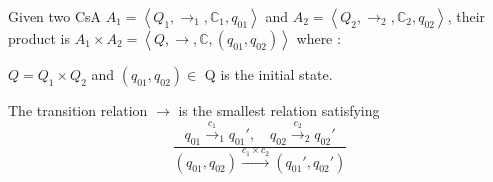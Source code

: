 \begin{definition}
	Given two CsA $A_1=\left\langle Q_1, \rightarrow_1, \mathbb{C}_1, q_{01} \right\rangle$ and $A_2=\left\langle Q_2, \rightarrow_2, \mathbb{C}_2, q_{02} \right\rangle$, their product is $ A_1 \times A_2 = \left \langle Q, \rightarrow, \mathbb{C}, (q_{01},q_{02}) \right \rangle$ where : 
	\begin{list}{-}{ }
		\item $Q= Q_1 \times Q_2 $ and $(q_{01},q_{02})\in$ Q is the initial state.
		\item The transition relation $\rightarrow$ is the smallest relation satisfying
		$$
		\frac{q_{01} \xrightarrow{c_1}_1 q_{01}' ,\quad q_{02} \xrightarrow{c_2}_2 q_{02}' }{(q_{01},q_{02}) \xrightarrow{c_1 \times c_2}(q_{01}',q_{02}')}
		$$
	\end{list}
\end{definition}
